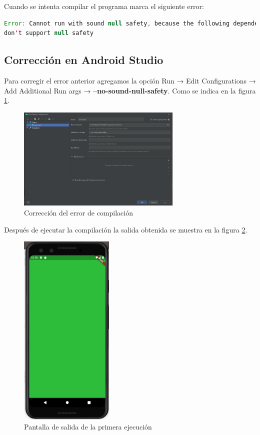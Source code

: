Cuando se intenta compilar el programa marca el siguiente error:

\begin{lstlisting}[language=java]
Error: Cannot run with sound null safety, because the following dependencies
don't support null safety
\end{lstlisting}


\subsection{Corrección en Android Studio}

Para corregir el error anterior agregamos la opción Run → Edit Configurations → Add Additional Run args → \textbf{--no-sound-null-safety}. Como se indica en la figura \ref{cap2:001}.

\begin{figure}[htb]
	\centering
	\includegraphics[width=0.7\textwidth]{capitulo2/androidstudio.png}
	\caption{Corrección del error de compilación}
	\label{cap2:001}
\end{figure} 

Después de ejecutar la compilación la salida obtenida se muestra en la figura \ref{cap2:002}.

\begin{figure}[htb]
	\centering
	\includegraphics[width=0.4\textwidth]{capitulo2/primerPantalla.png}
	\caption{Pantalla de salida de la primera ejecución}
	\label{cap2:002}
\end{figure} 


